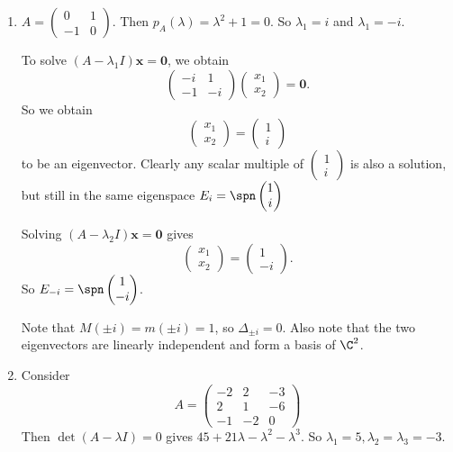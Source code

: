 \documentclass[a4paper]{article}
\begin{document}
\begin{eg}\leavevmode
  \begin{enumerate}
    \item $A = \begin{pmatrix} 0 & 1\\
        -1 & 0
      \end{pmatrix}$. Then $p_A(\lambda) = \lambda^2 + 1 = 0$. So $\lambda_1 = i$ and $\lambda_1 = -i$.

      To solve $(A - \lambda_1 I)\mathbf{x} = \mathbf{0}$, we obtain
      \[
        \begin{pmatrix}
          -i & 1\\-1 & -i
        \end{pmatrix}
        \begin{pmatrix}
          x_1\\x_2
        \end{pmatrix}
        = \mathbf{0}.
      \]
      So we obtain
      \[
        \begin{pmatrix}
          x_1\\x_2
        \end{pmatrix} =
        \begin{pmatrix}
          1\\i
        \end{pmatrix}
      \]
      to be an eigenvector. Clearly any scalar multiple of $\begin{pmatrix}
        1\\i
      \end{pmatrix}$ is also a solution, but still in the same eigenspace $E_i = \spn \begin{pmatrix}
        1\\i
      \end{pmatrix}$

      Solving $(A - \lambda_2I)\mathbf{x} = \mathbf{0}$ gives
      \[
        \begin{pmatrix}
          x_1\\x_2
        \end{pmatrix} =
        \begin{pmatrix}
          1\\-i
        \end{pmatrix}.
      \]
      So $E_{-i} = \spn
      \begin{pmatrix}
        1\\-i
      \end{pmatrix}$.

      Note that $M(\pm i) = m(\pm i) = 1$, so $\Delta_{\pm i} = 0$. Also note that the two eigenvectors are linearly independent and form a basis of $\C^2$.
    \item Consider
      \[
        A = \begin{pmatrix}
          -2 & 2 & -3\\
          2 & 1 & -6\\
          -1 & -2 & 0
        \end{pmatrix}
      \]
      Then $\det(A - \lambda I) = 0$ gives $45 + 21\lambda - \lambda^2 - \lambda^3$. So $\lambda_1 = 5, \lambda_2 = \lambda_3 = -3$.


\end{enumerate}
\end{eg}
\end{document}
